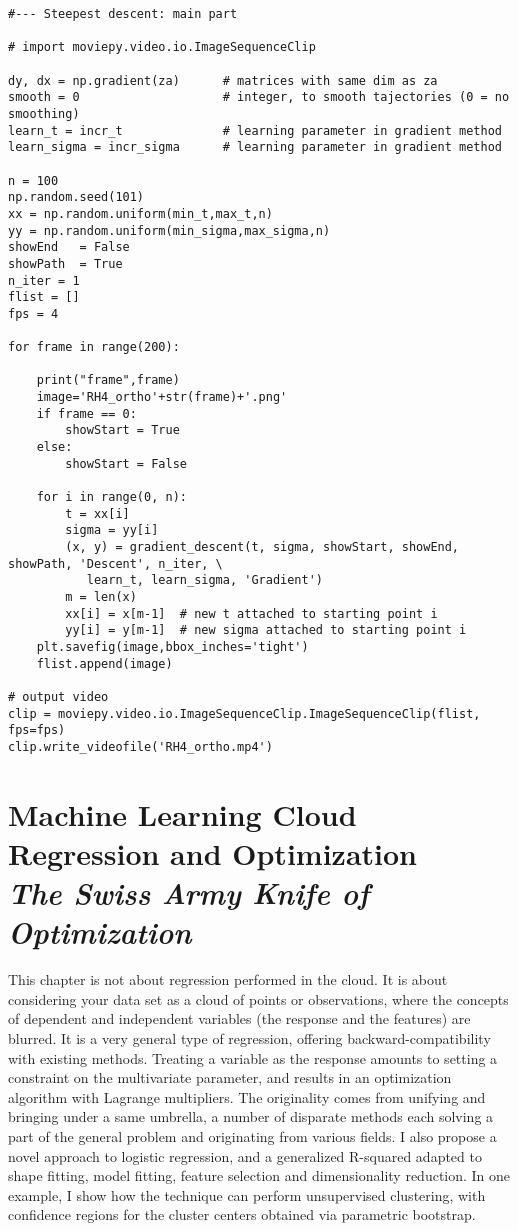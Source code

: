 \documentclass[oneside,10pt]{book}
\newcommand\Chapter[2]{
  \chapter[#1]{#1\\[2ex]\Large\itshape#2}
}
\begin{document}
\begin{lstlisting}
#--- Steepest descent: main part 

# import moviepy.video.io.ImageSequenceClip 

dy, dx = np.gradient(za)      # matrices with same dim as za 
smooth = 0                    # integer, to smooth tajectories (0 = no smoothing)
learn_t = incr_t              # learning parameter in gradient method  
learn_sigma = incr_sigma      # learning parameter in gradient method 

n = 100
np.random.seed(101)
xx = np.random.uniform(min_t,max_t,n)
yy = np.random.uniform(min_sigma,max_sigma,n)
showEnd   = False
showPath  = True
n_iter = 1 
flist = []
fps = 4

for frame in range(200):
    
    print("frame",frame)
    image='RH4_ortho'+str(frame)+'.png'
    if frame == 0:
        showStart = True
    else:
        showStart = False

    for i in range(0, n):  
        t = xx[i]
        sigma = yy[i]
        (x, y) = gradient_descent(t, sigma, showStart, showEnd, showPath, 'Descent', n_iter, \
           learn_t, learn_sigma, 'Gradient')
        m = len(x)
        xx[i] = x[m-1]  # new t attached to starting point i
        yy[i] = y[m-1]  # new sigma attached to starting point i
    plt.savefig(image,bbox_inches='tight')
    flist.append(image)

# output video 
clip = moviepy.video.io.ImageSequenceClip.ImageSequenceClip(flist, fps=fps) 
clip.write_videofile('RH4_ortho.mp4')
\end{lstlisting}


\Chapter{Machine Learning Cloud Regression and Optimization}{The Swiss Army Knife of Optimization} \label{chap1v}

This chapter is not about regression performed in the cloud. It is about considering your data set as a cloud of points or observations, where the
 concepts of dependent and independent variables (the response and the features) are blurred. It is a very general type of regression, offering
 backward-compatibility with existing methods. Treating a variable as the response amounts to setting a constraint on the multivariate parameter, and results in an optimization algorithm with  Lagrange multipliers. The originality comes from unifying and bringing under a same umbrella, a number of disparate methods each solving a part of the general problem and originating from various fields. I also 
 propose a novel approach to logistic regression, and a generalized R-squared adapted to shape fitting, model fitting, \textcolor{index}{feature selection} 
and  \textcolor{index}{dimensionality reduction}.  In one example, I show how the technique can perform unsupervised clustering, with \textcolor{index}{confidence regions} for
 the cluster centers obtained via parametric bootstrap.
\end{document}
